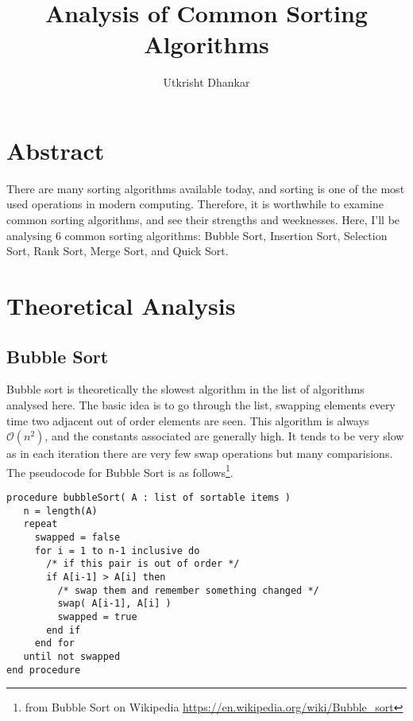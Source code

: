 \documentclass[12pt]{article}
\title{Analysis of Common Sorting Algorithms}
\author{Utkrisht Dhankar}
\begin{document}
	\maketitle
	\newpage
	
	\section{Abstract}
	There are many sorting algorithms available today, and sorting is one of the most used operations in modern computing. Therefore, it is worthwhile to examine common sorting algorithms, and see their strengths and weeknesses. Here, I'll be analysing 6 common sorting algorithms: Bubble Sort, Insertion Sort, Selection Sort, Rank Sort, Merge Sort, and Quick Sort. 
		
	\section{Theoretical Analysis}
		\subsection{Bubble Sort}
		Bubble sort is theoretically the slowest algorithm in the list of algorithms analysed here. The basic idea is to go through the list, swapping elements every time two adjacent out of order elements are seen. This algorithm is always $ \mathcal{O} (n^2) $, and the constants associated are generally high. It tends to be very slow as in each iteration there are very few swap operations but many comparisions. The pseudocode for Bubble Sort is as follows\footnote{from Bubble Sort on Wikipedia \url{https://en.wikipedia.org/wiki/Bubble_sort}}.
			
			\begin{center}
\begin{verbatim}
procedure bubbleSort( A : list of sortable items )
   n = length(A)
   repeat 
     swapped = false
     for i = 1 to n-1 inclusive do
       /* if this pair is out of order */
       if A[i-1] > A[i] then
         /* swap them and remember something changed */
         swap( A[i-1], A[i] )
         swapped = true
       end if
     end for
   until not swapped
end procedure
\end{verbatim}
			\end{center}
		
\end{document}
